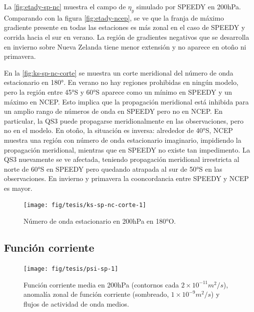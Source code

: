 \documentclass[spanish,a4paper,12pt,oneside]{book}
\begin{document}
La \autoref{fig:etady-sp-nc} muestra el campo de \(\eta_{y}\) simulado
por SPEEDY en 200hPa. Comparando con la figura \autoref{fig:etady-ncep},
se ve que la franja de máximo gradiente presente en todas las estaciones
es más zonal en el caso de SPEEDY y corrida hacia el sur en verano. La
región de gradientes negativos que se desarrolla en invierno sobre Nueva
Zelanda tiene menor extensión y no aparece en otoño ni primavera.

En la \autoref{fig:ks-sp-nc-corte} se muestra un corte meridional del
número de onda estacionario en 180°. En verano no hay regiones
prohibidas en ningún modelo, pero la región entre 45°S y 60°S aparece
como un mínimo en SPEEDY y un máximo en NCEP. Esto implica que la
propagación meridional está inhibida para un amplio rango de números de
onda en SPEEDY pero no en NCEP. En particular, la QS3 puede propagarse
meridionalmente en las observaciones, pero no en el modelo. En otoño, la
situación es inversa: alrededor de 40°S, NCEP muestra una región con
número de onda estacionario imaginario, impidiendo la propagación
meridional, mientras que en SPEEDY no existe tan impedimento. La QS3
nuevamente se ve afectada, teniendo propagación meridional irrestricta
al norte de 60°S en SPEEDY pero quedando atrapada al sur de 50°S en las
observaciones. En invierno y primavera la cooncordancia entre SPEEDY y
NCEP es mayor.

\begin{figure}
\texttt{[image: fig/tesis/ks-sp-nc-corte-1]} \caption{Número de onda estacionario en 200hPa en 180°O.}\label{fig:ks-sp-nc-corte}
\end{figure}

\subsection{Función corriente}\label{funcion-corriente-2}

\begin{landscape}\begin{figure}

{\centering \texttt{[image: fig/tesis/psi-sp-1]} 

}

\caption{Función corriente media en 200hPa (contornos cada $2\times10^{-11}m^2/s$), anomalía zonal de función corriente (sombreado,  $1\times10^{-9}m^2/s$) y flujos de actividad de onda medios.}\label{fig:psi-sp}
\end{figure}
\end{landscape}
\end{document}
